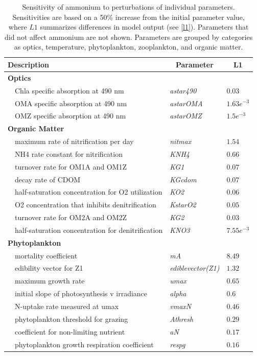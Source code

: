 \documentclass[review]{elsarticle}\usepackage[]{graphicx}\usepackage[]{color}
\begin{document}
\begin{table}[!tbp]
{\footnotesize
\caption{Sensitivity of ammonium to perturbations of individual parameters.  Sensitivities are based on a 50\% increase from the initial parameter value, where $L1$ summarizes differences in model output (see \cref{l1}).  Parameters that did not affect ammonium are not shown.  Parameters are grouped by categories as optics, temperature, phytoplankton, zooplankton, and organic matter.\label{tab:nh4sens}} 
\begin{center}
\begin{tabular}{lll}
\hline\hline
\multicolumn{1}{l}{Description}&\multicolumn{1}{c}{Parameter}&\multicolumn{1}{c}{L1}\tabularnewline
\hline
{\bfseries Optics}&&\tabularnewline
~~Chla specific absorption at 490 nm&\textit{astar490}&$0.03$\tabularnewline
~~OMA specific absorption at 490 nm&\textit{astarOMA}&$1.63e^{-3}$\tabularnewline
~~OMZ specific absorption at 490 nm&\textit{astarOMZ}&$1.5e^{-3}$\tabularnewline
\hline
{\bfseries Organic Matter}&&\tabularnewline
~~maximum rate of nitrification per day&\textit{nitmax}&$1.54$\tabularnewline
~~NH4 rate constant for nitrification&\textit{KNH4}&$0.66$\tabularnewline
~~turnover rate for OM1A and OM1Z&\textit{KG1}&$0.07$\tabularnewline
~~decay rate of CDOM&\textit{KGcdom}&$0.07$\tabularnewline
~~half-saturation concentration for O2 utilization&\textit{KO2}&$0.06$\tabularnewline
~~O2 concentration that inhibits denitrification&\textit{KstarO2}&$0.05$\tabularnewline
~~turnover rate for OM2A and OM2Z&\textit{KG2}&$0.03$\tabularnewline
~~half-saturation concentration for denitrification&\textit{KNO3}&$7.55e^{-3}$\tabularnewline
\hline
{\bfseries Phytoplankton}&&\tabularnewline
~~mortality coefficient&\textit{mA}&$8.49$\tabularnewline
~~edibility vector for Z1&\textit{ediblevector(Z1)}&$1.32$\tabularnewline
~~maximum growth rate&\textit{umax}&$0.65$\tabularnewline
~~initial slope of photosynthesis v irradiance&\textit{alpha}&$0.6$\tabularnewline
~~N-uptake rate measured at umax&\textit{vmaxN}&$0.46$\tabularnewline
~~phytoplankton threshold for grazing&\textit{Athresh}&$0.29$\tabularnewline
~~coefficient for non-limiting nutrient&\textit{aN}&$0.17$\tabularnewline
~~phytoplankton growth respiration coefficient&\textit{respg}&$0.16$\tabularnewline

\end{tabular}
\end{center}}
\end{table}
\end{document}
